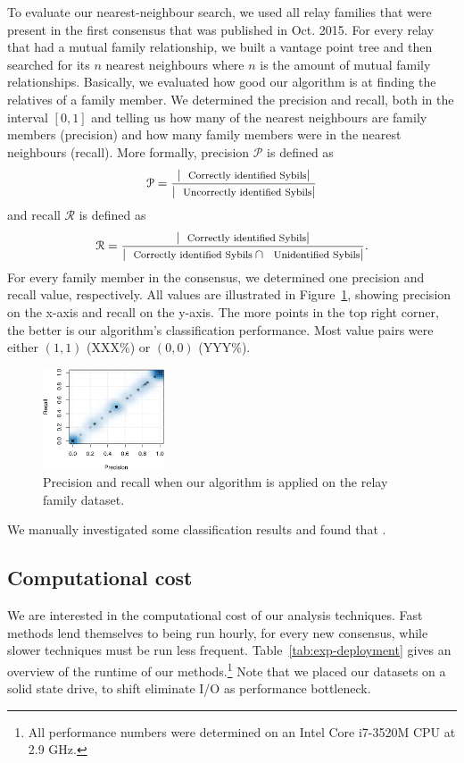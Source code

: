 To evaluate our nearest-neighbour search, we used all relay families that were
present in the first consensus that was published in Oct. 2015.   For every relay that had a mutual
family relationship, we built a vantage point tree and then searched for its $n$
nearest neighbours where $n$ is the amount of mutual family relationships.
Basically, we evaluated how good our algorithm is at finding the relatives of a
family member.  We determined the precision and recall, both in the interval
$[0,1]$ and telling us how many of the nearest neighbours are family members
(precision) and how many family members were in the nearest neighbours (recall).
More formally, precision $\mathcal{P}$ is defined as
$$\mathcal{P} = \frac{|\textrm{\footnotesize Correctly identified Sybils}|}
{|\textrm{\footnotesize Uncorrectly identified Sybils}|}$$
and recall $\mathcal{R}$ is defined as
$$\mathcal{R} = \frac{|\textrm{\footnotesize Correctly identified Sybils}|}
{|\textrm{\footnotesize Correctly identified Sybils} \cap \textrm{\footnotesize Unidentified Sybils}|}.$$
For every family member in the consensus, we determined one precision and recall
value, respectively.  All values are illustrated in
Figure~\ref{fig:precision-recall}, showing precision on the x-axis and recall on
the y-axis.  The more points in the top right corner, the better is our
algorithm's classification performance.  Most value pairs were either $(1,1)$
(XXX\%) or $(0,0)$ (YYY\%).

\begin{figure}[t]
	\centering
	\includegraphics[width=0.32\textwidth]{diagrams/precision-recall.pdf}
	\caption{Precision and recall when our algorithm is applied on the relay
		family dataset.}
	\label{fig:precision-recall}
\end{figure}

We manually investigated some classification results and found that
.

\subsection{Computational cost}
\label{sec:performance}
We are interested in the computational cost of our analysis techniques.  Fast
methods lend themselves to being run hourly, for every new consensus, while
slower techniques must be run less frequent.  Table~\ref{tab:exp-deployment}
gives an overview of the runtime of our methods.\footnote{All performance
numbers were determined on an Intel Core i7-3520M CPU at 2.9 GHz.}  Note that we
placed our datasets on a solid state drive, to shift eliminate I/O as
performance bottleneck.

